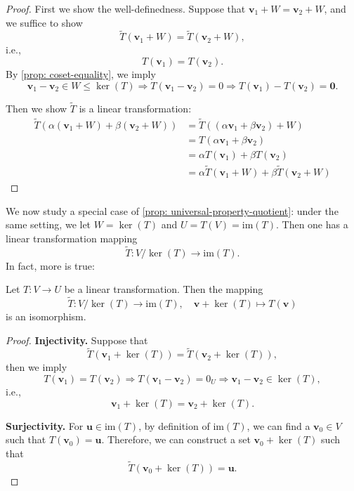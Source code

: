\begin{proof}
First we show the well-definedness. Suppose that \( \mathbf{v}_1 + W = \mathbf{v}_2 + W \), and we suffice to show 
\[
\widetilde{T}(\mathbf{v}_1 + W) = \widetilde{T}(\mathbf{v}_2 + W),
\]
i.e., 
\[
T(\mathbf{v}_1) = T(\mathbf{v}_2).
\]
By \autoref{prop: coset-equality}, we imply
\[
\mathbf{v}_1 - \mathbf{v}_2 \in W \leq \ker(T) \Rightarrow T(\mathbf{v}_1 - \mathbf{v}_2) = 0 \Rightarrow T(\mathbf{v}_1) - T(\mathbf{v}_2) = \mathbf{0}.
\]

Then we show \( \widetilde{T} \) is a linear transformation:
\begin{align*}
\widetilde{T}(\alpha(\mathbf{v}_1 + W) + \beta(\mathbf{v}_2 + W)) 
&= \widetilde{T}((\alpha \mathbf{v}_1 + \beta \mathbf{v}_2) + W) \\
&= T(\alpha \mathbf{v}_1 + \beta \mathbf{v}_2) \\
&= \alpha T(\mathbf{v}_1) + \beta T(\mathbf{v}_2) \\
&= \alpha \widetilde{T}(\mathbf{v}_1 + W) + \beta \widetilde{T}(\mathbf{v}_2 + W)
\end{align*}
\end{proof}

We now study a special case of \autoref{prop: universal-property-quotient}: under the same setting, we let
\( W = \ker(T) \) and $U = T(V) = \mathrm{im}(T)$.
Then one has a linear transformation mapping 
\[
\widetilde{T}: V/\ker{(T)} \to \mathrm{im}(T).
\]
In fact, more is true:
\begin{theorem}\label{thm: first-isomorphism}
Let \( T: V \to U \) be a linear transformation. Then the mapping
\[
\widetilde{T}: V/\ker(T) \to \mathrm{im}(T), \quad \mathbf{v} + \ker(T) \mapsto T(\mathbf{v})
\]
is an isomorphism.
\end{theorem}

\begin{proof}
\textbf{Injectivity.} Suppose that 
\[
\widetilde{T}(\mathbf{v}_1 + \ker(T)) = \widetilde{T}(\mathbf{v}_2 + \ker(T)),
\]
then we imply
\[
T(\mathbf{v}_1) = T(\mathbf{v}_2) \Rightarrow T(\mathbf{v}_1 - \mathbf{v}_2) = 0_U \Rightarrow \mathbf{v}_1 - \mathbf{v}_2 \in \ker(T),
\]
i.e., 
\[
\mathbf{v}_1 + \ker(T) = \mathbf{v}_2 + \ker(T).
\]

\textbf{Surjectivity.} For \( \mathbf{u} \in \mathrm{im}(T) \), by definition of \( \mathrm{im}(T) \), we can find a \( \mathbf{v}_0 \in V \) such that \( T(\mathbf{v}_0) = \mathbf{u} \). Therefore, we can construct a set \( \mathbf{v}_0 + \ker(T) \) such that
\[
\widetilde{T}(\mathbf{v}_0 + \ker(T)) = \mathbf{u}.
\]
\end{proof}

